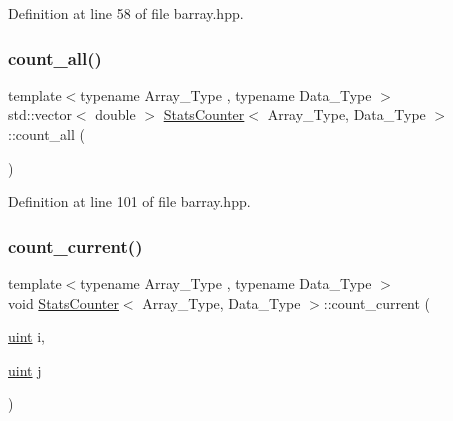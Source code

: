 Definition at line 58 of file barray.\+hpp.

\mbox{\label{classbarray_1_1_stats_counter_a83bd92031a1499109c98f238221cbd67}} 
\subsubsection{\texorpdfstring{count\+\_\+all()}{count\_all()}}
{\footnotesize\ttfamily template$<$typename Array\+\_\+\+Type , typename Data\+\_\+\+Type $>$ \\
std\+::vector$<$ double $>$ \hyperlink{classbarray_1_1_stats_counter}{Stats\+Counter}$<$ Array\+\_\+\+Type, Data\+\_\+\+Type $>$\+::count\+\_\+all (\begin{DoxyParamCaption}{ }\end{DoxyParamCaption})\hspace{0.3cm}{\ttfamily [inline]}}



Definition at line 101 of file barray.\+hpp.

\mbox{\label{classbarray_1_1_stats_counter_ab81166f7cb67eeaecc469016d237019a}} 
\subsubsection{\texorpdfstring{count\+\_\+current()}{count\_current()}}
{\footnotesize\ttfamily template$<$typename Array\+\_\+\+Type , typename Data\+\_\+\+Type $>$ \\
void \hyperlink{classbarray_1_1_stats_counter}{Stats\+Counter}$<$ Array\+\_\+\+Type, Data\+\_\+\+Type $>$\+::count\+\_\+current (\begin{DoxyParamCaption}\item[{\hyperlink{namespacebarray_af9756a31953db233f80a9cfe1ef31c32}{uint}}]{i,  }\item[{\hyperlink{namespacebarray_af9756a31953db233f80a9cfe1ef31c32}{uint}}]{j }\end{DoxyParamCaption})\hspace{0.3cm}{\ttfamily [inline]}}



